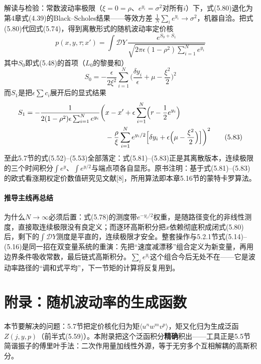 解读与检验：常数波动率极限（$\xi=0=\rho$、$e^{y_i}=\sigma^{2}$对所有$i$）下，式(5.80)退化为第4章式(4.39)的Black--Scholes结果——等效方差
$\frac{1}{N}\sum_ie^{y_i}\to\sigma^{2}$，机器自洽。把式(5.80)代回式(5.74)，得到离散形式的随机波动率定价核
\begin{equation*}
p(x,y,\tau;x')=\int\mathcal{D}Y\,
\frac{e^{S_{0}+S_{1}}}{\sqrt{2\pi\epsilon(1-\rho^{2})
\sum_{i=1}^{N}e^{y_i}}}
\tag{5.81}
\end{equation*}
其中$S_{0}$即式(5.48)的首项（$L_0$的黎曼和）
\begin{equation*}
S_{0}=-\frac{\epsilon}{2\xi^{2}}\sum_{i=1}^{N}
\biggl(\frac{\delta y_i}{\epsilon}+\mu-\frac{\xi^{2}}{2}\biggr)^{2}
\tag{5.82}
\end{equation*}
而$S_{1}$是把$\epsilon\sum c_i$展开后的显式结果
\begin{align*}
S_{1}=-\frac{1}{2(1-\rho^{2})\epsilon\sum_{i=1}^{N}e^{y_i}}\biggl(&x-x'
+\epsilon\sum_{i=1}^{N}\Bigl(r-\frac{1}{2}e^{y_i}\Bigr)\\
&-\frac{\rho}{\xi}\sum_{i=1}^{N}e^{y_i/2}
\Bigl[\delta y_i+\epsilon\Bigl(\mu-\frac{\xi^{2}}{2}\Bigr)\Bigr]\biggr)^{2}
\tag{5.83}
\end{align*}
至此5.7节的式(5.52)--(5.53)全部落定：式(5.81)--(5.83)正是其离散版本，连续极限的三个时间积分$\int e^y$、$\int e^{y/2}$与端点项各自显形。原书注明：基于式(5.81)--(5.83)的欧式看涨期权定价数值研究见文献[8]，所用算法即本章5.16节的蒙特卡罗算法。

\paragraph{推导主线再总结}
为什么$N\to\infty$必须后置：式(5.78)的测度带$e^{-y_i/2}$权重，是随路径变化的非线性测度，直接取连续极限没有良定义；而逐环高斯积分把$x$依赖彻底积成闭式(5.80)后，剩下的$\int\mathcal{D}Y$测度是平直的，连续极限才安全。整套操作与5.2.1节式(5.14)--(5.16)是同一招在双变量系统的重演：先把“速度减漂移”组合定义为新变量，再用边界条件吸收常数，最后链式高斯积分。$\sum_ie^{y_i}$这个组合今后无处不在——它是波动率路径的“调和式平均”，下一节矩的计算将反复用到。

\section{附录：随机波动率的生成函数}

本节要解决的问题：5.7节把定价核化归为矩$\langle u^nw^mv^p\rangle$，矩又化归为生成泛函$Z(j,y,p)$（前半式(5.59)）。本附录把这个泛函积分\textbf{精确}积出——工具正是5.5节简谐振子的傅里叶手法：二次作用量加线性外源，等于无穷多个互相解耦的高斯积分。

